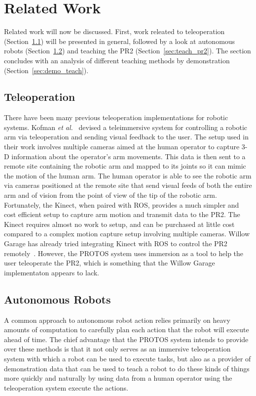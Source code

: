 \documentclass{sig-alternate}
\begin{document}
\section{Related Work}
\label{sec:related_work}
\indent  Related work will now be discussed. First, work releated to teleoperation (Section~\ref{sec:teleop}) will be presented in general, followed by a look at
autonomous robots (Section~\ref{sec:autobots}) and teaching the PR2 (Section~\ref{sec:teach_pr2}). The section concludes with an analysis of different teaching methods 
by demonstration (Section~\ref{sec:demo_teach}).

\subsection{Teleoperation}
\label{sec:teleop}
\indent There have been many previous teleoperation implementations for robotic systems. Kofman \textit{et al.}~\cite{robot_interface} devised a teleimmersive system for
controlling a robotic arm via teleoperation and sending visual feedback to the user. The setup used in their work involves multiple cameras aimed at the human operator to 
capture 3-D information about the operator's arm movements. This data is then sent to a remote site containing the robotic arm and mapped to its joints so it can mimic the 
motion of the human arm. The human operator is able to see the robotic arm via cameras positioned at the remote site that send visual feeds of both the entire arm and of 
vision from the point of view of the tip of the robotic arm. Fortunately, the Kinect, when paired with ROS, provides a much simpler and cost efficient setup to 
capture arm motion and transmit data to the PR2. The Kinect requires almost no work to setup, and can be purchased at little cost compared to a complex motion capture setup
involving multiple cameras. Willow Garage has already 
tried integrating Kinect with ROS to control the PR2 remotely~\cite{willow_kinect}. However, the PROTOS system uses immersion as a tool to help the user teleoperate
the PR2, which is something that the Willow Garage implementaton appears to lack.

\subsection{Autonomous Robots}
\label{sec:autobots}
\indent A common approach to autonomous robot action relies primarily on heavy amounts of computation to carefully 
plan each action that the robot will execute ahead of time.  The chief 
advantage that the PROTOS system intends to provide over these methods is that it 
not only serves as an immersive teleoperation system with which a robot can be used to
execute tasks, but also as a provider of demonstration data
that can be used to teach a robot to do these kinds
of things more quickly and naturally by using data from a human operator using the 
teleoperation system execute the actions.
\end{document}

